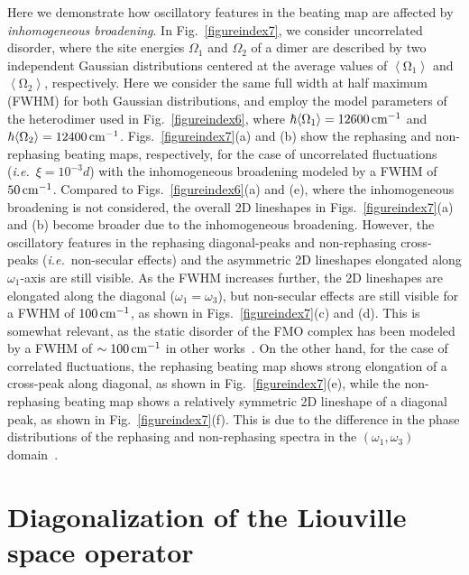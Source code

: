 \documentclass[%
 reprint,%
 amssymb, amsmath,%
 aip,cha,%
]{revtex4-1}
\begin{document}
Here we demonstrate how oscillatory features in the beating map are affected by {\it inhomogeneous broadening}. In Fig.~\ref{figureindex7}, we consider uncorrelated disorder, where the site energies $\Omega_1$ and $\Omega_2$ of a dimer are described by two independent Gaussian distributions centered at the average values of $\mathrm{\left\langle\Omega_1\right\rangle}$ and $\mathrm{\left\langle\Omega_2\right\rangle}$, respectively. Here we consider the same full width at half maximum (FWHM) for both Gaussian distributions, and employ the model parameters of the heterodimer used in Fig.~\ref{figureindex6}, where $\hbar\mathrm{\left\langle\Omega_1\right\rangle}=12600\,{\rm cm}^{-1}$ and $\hbar\mathrm{\left\langle\Omega_2\right\rangle}=12400\,{\rm cm}^{-1}$. Figs.~\ref{figureindex7}(a) and (b) show the rephasing and non-rephasing beating maps, respectively, for the case of uncorrelated fluctuations ({\it i.e.}~$\xi=10^{-3}d$) with the inhomogeneous broadening modeled by a FWHM of $50\,{\rm cm}^{-1}$. Compared to Figs.~\ref{figureindex6}(a) and (e), where the inhomogeneous broadening is not considered, the overall 2D lineshapes in Figs.~\ref{figureindex7}(a) and (b) become broader due to the inhomogeneous broadening. However, the oscillatory features in the rephasing diagonal-peaks and non-rephasing cross-peaks ({\it i.e.}~non-secular effects) and the asymmetric 2D lineshapes elongated along $\omega_1$-axis are still visible. As the FWHM increases further, the 2D lineshapes are elongated along the diagonal ($\omega_1=\omega_3$), but non-secular effects are still visible for a FWHM of $100\,{\rm cm}^{-1}$, as shown in Figs.~\ref{figureindex7}(c) and (d).  This is somewhat relevant, as the static disorder of the FMO complex has been modeled by a FWHM of $\sim 100\,{\rm cm}^{-1}$ in other works~\cite{KreisbeckJPCL2012,AdolphsBJ2006}. On the other hand, for the case of correlated fluctuations, the rephasing beating map shows strong elongation of a cross-peak along diagonal, as shown in Fig.~\ref{figureindex7}(e), while the non-rephasing beating map shows a relatively symmetric 2D lineshape of a diagonal peak, as shown in Fig.~\ref{figureindex7}(f). This is due to the difference in the phase distributions of the rephasing and non-rephasing spectra in the $(\omega_1,\omega_3)$ domain~\cite{RancovaJCP2015,Hamm2011}.

\section{Diagonalization of the Liouville space operator}
\end{document}
